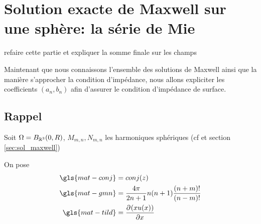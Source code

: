 \section{Solution exacte de Maxwell sur une sphère: la série de Mie}\label{sec:serie_mie}

\begin{TODO}
  refaire cette partie et expliquer la somme finale sur les champs
\end{TODO}

Maintenant que nous connaissons l'ensemble des solutions de Maxwell ainsi que la manière s'approcher la condition d'impédance, nous allons expliciter les coefficients \((a_n,b_n)\)  afin d'assurer le condition d'impédance de surface.


\subsection{Rappel}
Soit \(\Omega = B_{\mathbb R^3}(0,R)\), \(M_{m,n}, N_{m,n}\) les harmoniques sphériques (cf \cite{marceaux_high-order_2000} et section \ref{sec:sol_maxwell})


On pose
\begin{align*}
  \gls{mat-conj} &=conj(z)\\
  \gls{mat-gmn} &=\frac{4\pi}{2n+1}n(n+1)\frac{(n+m)!}{(n-m)!}\\
  \gls{mat-tild} &= \ddr{x}{(xu(x))}
\end{align*}

